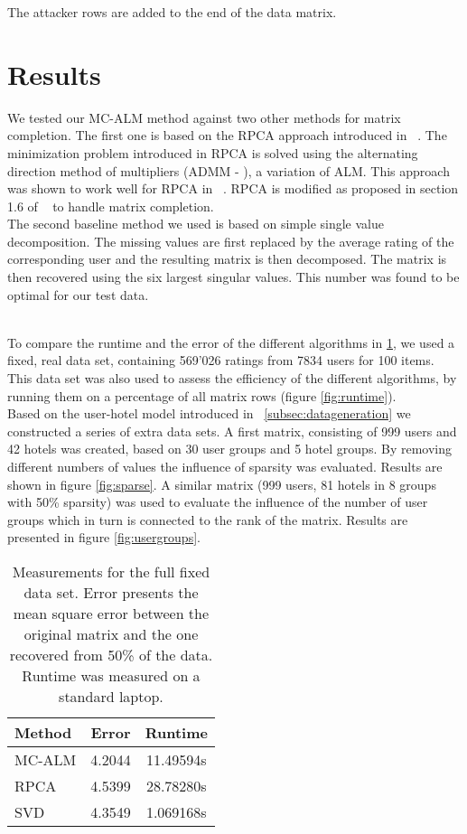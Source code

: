 \documentclass[10pt,conference,compsocconf]{IEEEtran}
\begin{document}
The attacker rows are added to the end of the data matrix.


\section{Results}
We tested our MC-ALM method against two other methods for matrix completion. The first one is based on the RPCA approach introduced in ~\cite{rpcapaper}. The minimization problem introduced in RPCA is solved using the alternating direction method of multipliers (ADMM - \cite{rpcaalgo}), a variation of ALM. This approach was shown to work well for RPCA in ~\cite{almpaper}. RPCA is modified as proposed in section 1.6 of ~\cite{rpcapaper} to handle matrix completion.\\
The second baseline method we used is based on simple single value decomposition. The missing values are first replaced by the average rating of the corresponding user and the resulting matrix is then decomposed. The matrix is then recovered using the six largest singular values. This number was found to be optimal for our test data. 

\\
To compare the runtime and the error of the different algorithms in \ref{tab:overview}, we used a fixed, real data set, containing 569'026 ratings from 7834 users for 100 items. This data set was also used to assess the efficiency of the different algorithms, by running them on a percentage of all matrix rows (figure \ref{fig:runtime}).\\

Based on the user-hotel model introduced in ~\ref{subsec:datageneration} we constructed a series of extra data sets. A first matrix, consisting of 999 users and 42 hotels was created, based on 30 user groups and 5 hotel groups. By removing different numbers of values the influence of sparsity was evaluated. Results are shown in figure \ref{fig:sparse}. A similar matrix (999 users, 81 hotels in 8 groups with 50\% sparsity) was used to evaluate the influence of the number of user groups which in turn is connected to the rank of the matrix. Results are presented in figure \ref{fig:usergroups}.


\begin{table}%
\centering
\begin{tabular}{|l|c|c|}
\hline
Method & Error & Runtime\\
\hline
MC-ALM & 4.2044 & 11.49594s\\
RPCA & 4.5399 & 28.78280s\\
SVD & 4.3549 & 1.069168s\\
\hline
\end{tabular}
\caption{Measurements for the full fixed data set. Error presents the mean square error between the original matrix and the one recovered from 50\% of the data. Runtime was measured on a standard laptop.}
\label{tab:overview}
\end{table}
\end{document}
